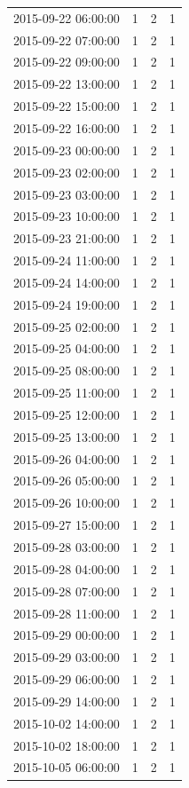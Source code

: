 \begin{tabular}{lrrr}
2015-09-22 06:00:00 & 1 & 2 & 1 \\
2015-09-22 07:00:00 & 1 & 2 & 1 \\
2015-09-22 09:00:00 & 1 & 2 & 1 \\
2015-09-22 13:00:00 & 1 & 2 & 1 \\
2015-09-22 15:00:00 & 1 & 2 & 1 \\
2015-09-22 16:00:00 & 1 & 2 & 1 \\
2015-09-23 00:00:00 & 1 & 2 & 1 \\
2015-09-23 02:00:00 & 1 & 2 & 1 \\
2015-09-23 03:00:00 & 1 & 2 & 1 \\
2015-09-23 10:00:00 & 1 & 2 & 1 \\
2015-09-23 21:00:00 & 1 & 2 & 1 \\
2015-09-24 11:00:00 & 1 & 2 & 1 \\
2015-09-24 14:00:00 & 1 & 2 & 1 \\
2015-09-24 19:00:00 & 1 & 2 & 1 \\
2015-09-25 02:00:00 & 1 & 2 & 1 \\
2015-09-25 04:00:00 & 1 & 2 & 1 \\
2015-09-25 08:00:00 & 1 & 2 & 1 \\
2015-09-25 11:00:00 & 1 & 2 & 1 \\
2015-09-25 12:00:00 & 1 & 2 & 1 \\
2015-09-25 13:00:00 & 1 & 2 & 1 \\
2015-09-26 04:00:00 & 1 & 2 & 1 \\
2015-09-26 05:00:00 & 1 & 2 & 1 \\
2015-09-26 10:00:00 & 1 & 2 & 1 \\
2015-09-27 15:00:00 & 1 & 2 & 1 \\
2015-09-28 03:00:00 & 1 & 2 & 1 \\
2015-09-28 04:00:00 & 1 & 2 & 1 \\
2015-09-28 07:00:00 & 1 & 2 & 1 \\
2015-09-28 11:00:00 & 1 & 2 & 1 \\
2015-09-29 00:00:00 & 1 & 2 & 1 \\
2015-09-29 03:00:00 & 1 & 2 & 1 \\
2015-09-29 06:00:00 & 1 & 2 & 1 \\
2015-09-29 14:00:00 & 1 & 2 & 1 \\
2015-10-02 14:00:00 & 1 & 2 & 1 \\
2015-10-02 18:00:00 & 1 & 2 & 1 \\
2015-10-05 06:00:00 & 1 & 2 & 1 \\

\end{tabular}
